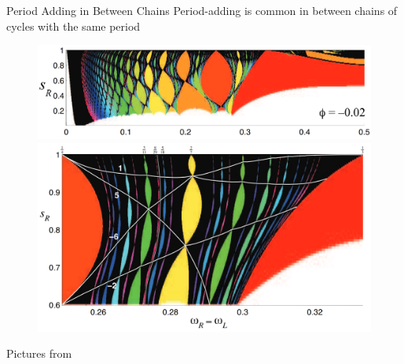 \begin{frame}{Period Adding in Between Chains}
	\vspace{-1em}
	Period-adding is common in between chains of cycles with the same period
	\begin{figure}
		\includegraphics[width=.5 \textwidth]{Figs/tounge_adding.png}\\
		\includegraphics[width=.5 \textwidth]{Figs/tounge_adding_zoomed.png}
	\end{figure}
	\vspace{-2em}
	\begin{flushright}
		Pictures from \cite{simpson2010}
	\end{flushright}
\end{frame}
